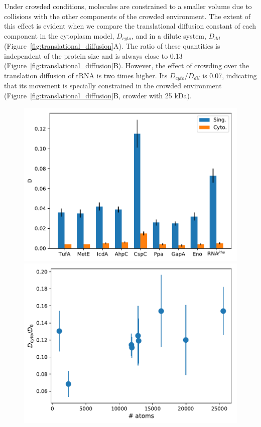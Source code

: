 \documentclass[journal=jacsat,manuscript=article]{achemso}
\begin{document}
Under crowded conditions, molecules are constrained to a smaller volume due to collisions with the other components of the crowded environment. The extent of this effect is evident when we compare the translational diffusion constant of each component in the cytoplasm model, $D_{cyto}$, and in a dilute system, $D_{dil}$ (Figure~\ref{fig:translational_diffusion}A). The ratio of these quantities is independent of the protein size and is always close to 0.13 (Figure~\ref{fig:translational_diffusion}B). However, the effect of crowding over the translation diffusion of tRNA is two times higher. Its $D_{cyto}/D_{dil}$ is 0.07, indicating that its movement is specially constrained in the crowded environment (Figure~\ref{fig:translational_diffusion}B, crowder with 25 kDa).

\begin{figure}[H]
\includegraphics[scale=0.5]{msd.pdf}
\includegraphics[scale=0.5]{diff_cyto_over_singles.pdf}

\end{figure}
\end{document}
